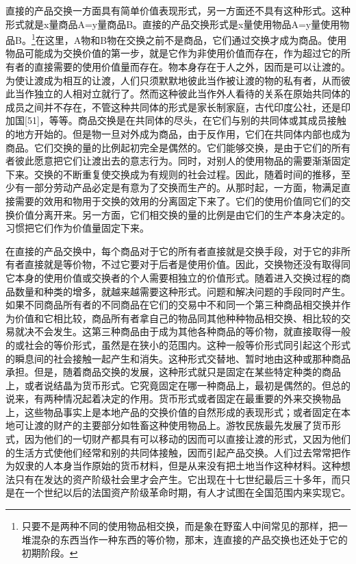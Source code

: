 \documentclass{ctexbook}
\begin{document}
直接的产品交换一方面具有简单价值表现形式，另一方面还不具有这种形式。这种形式就是x量商品A=y量商品B。直接的产品交换形式是x量使用物品A=y量使用物品B。\footnote{只要不是两种不同的使用物品相交换，而是象在野蛮人中间常见的那样，把一堆混杂的东西当作一种东西的等价物，那末，连直接的产品交换也还处于它的初期阶段。}在这里，A物和B物在交换之前不是商品，它们通过交换才成为商品。使用物品可能成为交换价值的第一步，就是它作为非使用价值而存在，作为超过它的所有者的直接需要的使用价值量而存在。物本身存在于人之外，因而是可以让渡的。为使让渡成为相互的让渡，人们只须默默地彼此当作被让渡的物的私有者，从而彼此当作独立的人相对立就行了。然而这种彼此当作外人看待的关系在原始共同体的成员之间并不存在，不管这种共同体的形式是家长制家庭，古代印度公社，还是印加国[51]，等等。商品交换是在共同体的尽头，在它们与别的共同体或其成员接触的地方开始的。但是物一旦对外成为商品，由于反作用，它们在共同体内部也成为商品。它们交换的量的比例起初完全是偶然的。它们能够交换，是由于它们的所有者彼此愿意把它们让渡出去的意志行为。同时，对别人的使用物品的需要渐渐固定下来。交换的不断重复使交换成为有规则的社会过程。因此，随着时间的推移，至少有一部分劳动产品必定是有意为了交换而生产的。从那时起，一方面，物满足直接需要的效用和物用于交换的效用的分离固定下来了。它们的使用价值同它们的交换价值分离开来。另一方面，它们相交换的量的比例是由它们的生产本身决定的。习惯把它们作为价值量固定下来。

在直接的产品交换中，每个商品对于它的所有者直接就是交换手段，对于它的非所有者直接就是等价物，不过它要对于后者是使用价值。因此，交换物还没有取得同它本身的使用价值或交换者的个人需要相独立的价值形式。随着进入交换过程的商品数量和种类的增多，就越来越需要这种形式。问题和解决问题的手段同时产生。如果不同商品所有者的不同商品在它们的交易中不和同一个第三种商品相交换并作为价值和它相比较，商品所有者拿自己的物品同其他种种物品相交换、相比较的交易就决不会发生。这第三种商品由于成为其他各种商品的等价物，就直接取得一般的或社会的等价形式，虽然是在狭小的范围内。这种一般等价形式同引起这个形式的瞬息间的社会接触一起产生和消失。这种形式交替地、暂时地由这种或那种商品承担。但是，随着商品交换的发展，这种形式就只是固定在某些特定种类的商品上，或者说结晶为货币形式。它究竟固定在哪一种商品上，最初是偶然的。但总的说来，有两种情况起着决定的作用。货币形式或者固定在最重要的外来交换物品上，这些物品事实上是本地产品的交换价值的自然形成的表现形式；或者固定在本地可让渡的财产的主要部分如牲畜这种使用物品上。游牧民族最先发展了货币形式，因为他们的一切财产都具有可以移动的因而可以直接让渡的形式，又因为他们的生活方式使他们经常和别的共同体接触，因而引起产品交换。人们过去常常把作为奴隶的人本身当作原始的货币材料，但是从来没有把土地当作这种材料。这种想法只有在发达的资产阶级社会里才会产生。它出现在十七世纪最后三十多年，而只是在一个世纪以后的法国资产阶级革命时期，有人才试图在全国范围内来实现它。
\end{document}
